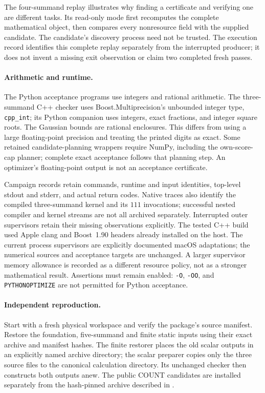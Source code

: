The four-summand replay illustrates why finding a certificate and verifying
one are different tasks. Its read-only mode first recomputes the complete
mathematical object, then compares every nonresource field with the supplied
candidate. The candidate's discovery process need not be trusted. The
execution record identifies this complete replay separately from the
interrupted producer; it does not invent a missing exit observation or claim
two completed fresh passes.

\paragraph{Arithmetic and runtime.}
The Python acceptance programs use integers and rational arithmetic.
The three-summand C++ checker uses Boost.Multiprecision's unbounded integer
type, \texttt{cpp\_int}; its Python companion uses integers, exact fractions,
and integer square roots. The Gaussian bounds are rational enclosures.
This differs from using a large floating-point precision and treating the
printed digits as exact. Some retained candidate-planning wrappers require NumPy, including the
own-score-cap planner; complete exact acceptance follows that planning
step. An optimizer's floating-point output is not an acceptance certificate.

Campaign records retain commands, runtime and input identities, top-level
stdout and stderr, and actual return codes. Native traces also identify the
compiled three-summand kernel and its $111$ invocations; successful nested
compiler and kernel streams are not all archived separately. Interrupted
outer supervisors retain their missing observations explicitly. The tested C++ build
used Apple clang and Boost~1.90 headers already installed on the host. The
current process supervisors are explicitly documented macOS adaptations;
the numerical sources and acceptance targets are unchanged. A larger
supervisor memory allowance is recorded as a different resource policy,
not as a stronger mathematical result. Assertions must remain enabled:
\texttt{-O}, \texttt{-OO}, and \texttt{PYTHONOPTIMIZE} are not permitted for
Python acceptance.

\paragraph{Independent reproduction.}
Start with a fresh physical workspace and verify the package's source
manifest. Restore the foundation, five-summand and finite static inputs using
their exact archive and manifest hashes. The finite restorer places the old
scalar outputs in an explicitly named archive directory; the scalar
preparer copies only the three source files to the canonical calculation
directory. Its unchanged checker then constructs both outputs anew.
The public COUNT candidates are installed separately from the hash-pinned
archive described in .


